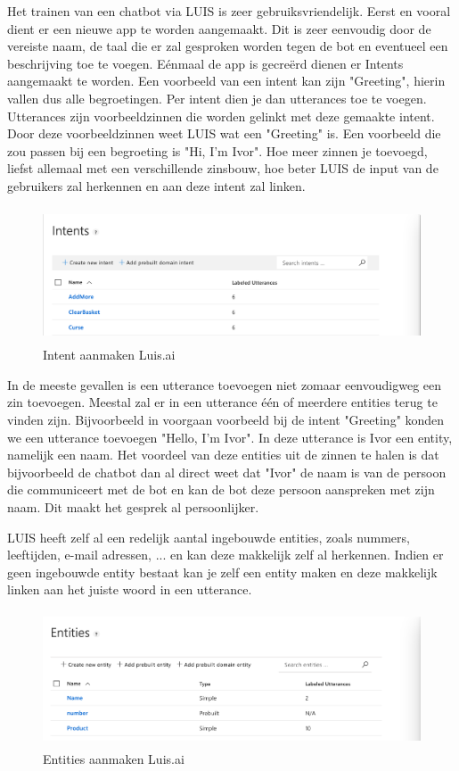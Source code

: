 Het trainen van een chatbot via LUIS is zeer gebruiksvriendelijk. Eerst en vooral dient er een nieuwe app te worden aangemaakt. Dit is zeer eenvoudig door de vereiste naam, de taal die er zal gesproken worden tegen de bot en eventueel een beschrijving toe te voegen. Eénmaal de app is gecreërd dienen er Intents aangemaakt te worden. Een voorbeeld van een intent kan zijn "Greeting", hierin vallen dus alle begroetingen. Per intent dien je dan utterances toe te voegen. Utterances zijn voorbeeldzinnen die worden gelinkt met deze gemaakte intent. Door deze voorbeeldzinnen weet LUIS wat een "Greeting" is. Een voorbeeld die zou passen bij een begroeting is "Hi, I'm Ivor". Hoe meer zinnen je toevoegd, liefst allemaal met een verschillende zinsbouw, hoe beter LUIS de input van de gebruikers zal herkennen en aan deze intent zal linken.


\begin{figure}[h!]
	\centering
	\includegraphics[height=4cm]{img/intents.png}
	\caption{Intent aanmaken Luis.ai}
	\label{fig:intents}
\end{figure}

In de meeste gevallen is een utterance toevoegen niet zomaar eenvoudigweg een zin toevoegen. Meestal zal er in een utterance één of meerdere entities terug te vinden zijn. Bijvoorbeeld in voorgaan voorbeeld bij de intent "Greeting" konden we een utterance toevoegen "Hello, I'm Ivor". In deze utterance is Ivor een entity, namelijk een naam. Het voordeel van deze entities uit de zinnen te halen is dat bijvoorbeeld de chatbot dan al direct weet dat "Ivor" de naam is van de persoon die communiceert met de bot en kan de bot deze persoon aanspreken met zijn naam. Dit maakt het gesprek al persoonlijker.

LUIS heeft zelf al een redelijk aantal ingebouwde entities, zoals nummers, leeftijden, e-mail adressen, ... en kan deze makkelijk zelf al herkennen. Indien er geen ingebouwde entity bestaat kan je zelf een entity maken en deze makkelijk linken aan het juiste woord in een utterance.

\begin{figure}[h!]
	\centering
	\includegraphics[height=4cm]{img/entity.png}
	\caption{Entities aanmaken Luis.ai}
	\label{fig:entity}
\end{figure}

